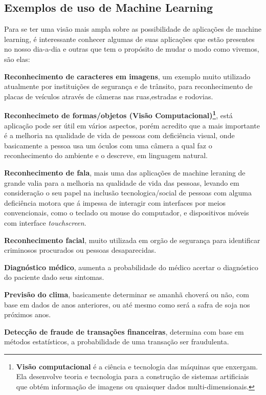 \subsection{Exemplos de uso de Machine Learning}
\label{cap:exemplos-ml}

Para se ter uma visão mais ampla sobre as possibilidade de aplicações de machine learning,
 é interessante conhecer algumas de suas aplicações que estão presentes no nosso dia-a-dia e outras que tem o propósito de 
 mudar o modo como vivemos, são elas:

 \begin{alineas}
	\item \textbf{Reconhecimento de caracteres em imagens}, um exemplo muito utilizado atualmente por instituições de segurança e de trânsito, para 
	reconhecimento de placas de veículos através de câmeras nas ruas,estradas e rodovias.  
	\item \textbf{Reconhecimeto de formas/objetos (Visão Computacional)\footnote{\textbf{Visão computacional} é a ciência e tecnologia das máquinas que enxergam. Ela desenvolve teoria e tecnologia para a construção de sistemas artificiais que obtém informação de imagens ou quaisquer dados multi-dimensionais.\cite{vscomp}}}, está aplicação pode ser útil em vários aspectos, porém acredito que a mais importante 
	é a melhoria na qualidade de vida de pessoas com deficiência visual, onde basicamente a pessoa usa um óculos com uma câmera a qual faz o reconhecimento do ambiente
	e o descreve, em linguagem natural.  
	\item \textbf{Reconhecimento de fala}, mais uma das aplicações de machine leraning de grande valia para a melhoria na qualidade de vida das pessoas,
	levando em consideração o seu papel na inclusão tecnologica/social de pessoas com alguma deficiência motora que á impessa de interagir 
	com interfaces por meios convencionais, como o teclado ou  mouse do computador, e dispositivos móveis com interface \textit{touchscreen}.
	\item \textbf{Reconhecimento facial}, muito utilizada em orgão de segurança para identificar criminosos procurados ou pessoas desaparecidas.
	\item \textbf{Diagnóstico médico}, aumenta a probabilidade do médico acertar o diagnóstico do paciente dado seus sintomas.   
	\item \textbf{Previsão do clima}, basicamente determinar se amanhã choverá ou não, com base em dados de anos anteriores, ou até mesmo como será a 
	safra de soja nos próximos anos. 
	\item \textbf{Detecção de fraude de transações financeiras}, determina com base em métodos estatísticos, a probabilidade de uma transação ser fraudulenta.
 \end{alineas}

